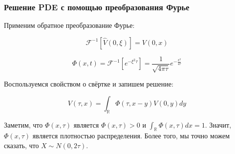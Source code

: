 \documentclass{beamer}
\begin{document}
\begin{frame}
\frametitle{Решение PDE с помощью преобразования Фурье}

Применим обратное преобразование Фурье:

\[
\mathcal{F}^{-1}[\hat{V}(0, \xi)] = V(0, x)
\]

\[
\Phi(x, t) = \mathcal{F}^{-1}[e^{-\xi^2 \tau}] = \frac{1}{\sqrt{4\pi \tau}} e^{-\frac{x^2}{4\tau}}
\]

Воспользуемся свойством о свёртке и запишем решение:

\[
V(\tau, x) = \int_\mathbb{R} \Phi(\tau, x-y)V(0, y) dy
\]

Заметим, что \(\Phi(x,\tau)\) является \(\Phi(x, \tau) > 0\) и \(\int_\mathbb{R} \Phi(x,\tau) dx = 1\). Значит, \(\Phi(x,\tau)\) является плотностью распределения. Более того, мы точно можем сказать, что \(X \sim N(0, 2\tau)\).


\end{frame}
\end{document}
